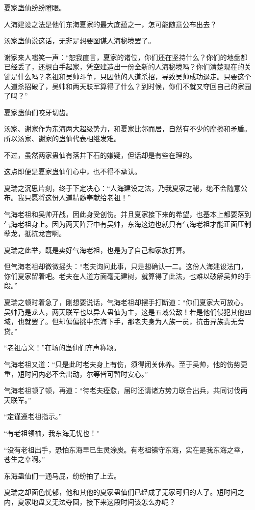 \begin{this_body}
夏家蛊仙纷纷瞪眼。

人海建设之法是他们东海夏家的最大底蕴之一，怎可能随意公布出去？

汤家蛊仙说这话，无非是想要图谋人海秘境罢了。

谢家来人嗤笑一声：“恕我直言，夏家的诸位，你们还在坚持什么？你们的地盘都已经丢了，还想白手起家，凭空建造出一份全新的人海秘境吗？你们清楚现在的关键是什么吗？老祖和吴帅斗争，只因他的人道杀招，导致吴帅成功退走。只要这个人道杀招破了，吴帅和两天联军算得了什么？到时候，你们不就又夺回自己的家园了吗？”

夏家蛊仙们咬牙切齿。

汤家、谢家作为东海两大超级势力，和夏家比邻而居，自然有不少的摩擦和矛盾。所以汤家、谢家的蛊仙代表相继发难。

不过，虽然两家蛊仙有落井下石的嫌疑，但话却是有些在理的。

这点即便是夏家蛊仙们心中，也不得不承认。

夏瑞之沉思片刻，终于下定决心：“人海建设之法，乃我夏家之秘，绝不会随意公布。我只愿将这份人道精髓奉献给老祖！”

气海老祖和吴帅开战，因此身受创伤。并且夏家接下来的希望，也基本上都要落到气海老祖身上。因为两天阵营中有吴帅，东海这边也就只有气海老祖才能正面压制孽龙，抵抗龙宫啊。

夏瑞之此举，既是卖好气海老祖，也是为了自己和家族打算。

但气海老祖却微微摇头：“老夫询问此事，只是想确认一二。这份人海建设法门，你们夏家留着吧。老夫在人道方面毫无建树，就算得了此法，也难以破解吴帅的手段。”

夏瑞之顿时着急了，刚想要说话，气海老祖却摆手打断道：“你们夏家大可放心。吴帅乃是龙人，两天联军也以异人蛊仙为主，这是五域公敌！若是他们侵犯其他四域，也就罢了。但却偏偏挑中东海下手，那老夫身为人族一员，抗击异族责无旁贷。”

“老祖高义！”在场的蛊仙们齐声称颂。

气海老祖又道：“只是此时老夫身上有伤，须得闭关休养。至于吴帅，他的伤势更重，短时间内必不会出动，尔等皆可暂时安心。”

气海老祖顿了顿，再道：“待老夫痊愈，届时还请诸方势力联合出兵，共同讨伐两天联军。”

“定谨遵老祖指示。”

“有老祖领袖，我东海无忧也！”

“没有老祖出手，恐怕东海早已生灵涂炭。有老祖镇守东海，实在是我东海之幸，苍生之幸啊。”

东海蛊仙们一通马屁，纷纷拍了上去。

夏瑞之却面色忧郁，他和其他的夏家蛊仙们已经成了无家可归的人了。短时间之内，夏家地盘又无法夺回，接下来这段时间该怎么办呢？


\end{this_body}
